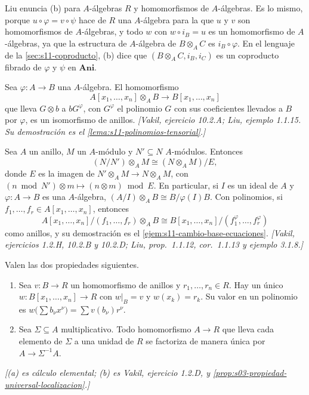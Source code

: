 Liu enuncia (b) para \(A\)-álgebras \(R\) y homomorfismos de \(A\)-álgebras. Es lo mismo, porque \(u\circ\varphi=v\circ\psi\) hace de \(R\) una \(A\)-álgebra para la que \(u\) y \(v\) son homomorfismos de \(A\)-álgebras, y todo \(w\) con \(w\circ i_B=u\) es un homomorfismo de \(A\)-álgebras, ya que la estructura de \(A\)-álgebra de \(B\otimes_A C\) es \(i_B\circ\varphi\). En el lenguaje de la \cref{sec:s11-coproducto}, (b) dice que \((B\otimes_A C,i_B,i_C)\) es un coproducto fibrado de \(\varphi\) y \(\psi\) en \(\mathbf{Ani}\).

\begin{prop}[Polinomios]
\label{prop:s11-polinomios-tensorial}
Sea \(\varphi\colon A\to B\) una \(A\)-álgebra. El homomorfismo
\[
 A[x_1,\ldots,x_n]\otimes_A B\longrightarrow B[x_1,\ldots,x_n]
\]
que lleva \(G\otimes b\) a \(bG^\varphi\), con \(G^\varphi\) el polinomio \(G\) con sus coeficientes llevados a \(B\) por \(\varphi\), es un isomorfismo de anillos. \emph{[Vakil, ejercicio 10.2.A; Liu, ejemplo 1.1.15. Su demostración es el \cref{lema:s11-polinomios-tensorial}.]}
\end{prop}

\begin{prop}
\label{prop:s11-exactitud-cocientes}
Sea \(A\) un anillo, \(M\) un \(A\)-módulo y \(N'\subseteq N\) \(A\)-módulos. Entonces
\[
 (N/N')\otimes_A M\cong(N\otimes_A M)/E,
\]
donde \(E\) es la imagen de \(N'\otimes_A M\to N\otimes_A M\), con \((n\bmod N')\otimes m\mapsto(n\otimes m)\bmod E\). En particular, si \(I\) es un ideal de \(A\) y \(\varphi\colon A\to B\) es una \(A\)-álgebra, \((A/I)\otimes_A B\cong B/\varphi(I)B\). Con polinomios, si \(f_1,\ldots,f_r\in A[x_1,\ldots,x_n]\), entonces
\[
 A[x_1,\ldots,x_n]/(f_1,\ldots,f_r)\otimes_A B\cong B[x_1,\ldots,x_n]/(f_1^\varphi,\ldots,f_r^\varphi)
\]
como anillos, y su demostración es el \cref{ejem:s11-cambio-base-ecuaciones}. \emph{[Vakil, ejercicios 1.2.H, 10.2.B y 10.2.D; Liu, prop.~1.1.12, cor.~1.1.13 y ejemplo 3.1.8.]}
\end{prop}

\begin{prop}
\label{prop:s11-universales}
Valen las dos propiedades siguientes.
\begin{enumerate}[label=(\alph*)]
\item Sea \(v\colon B\to R\) un homomorfismo de anillos y \(r_1,\ldots,r_n\in R\). Hay un único \(w\colon B[x_1,\ldots,x_n]\to R\) con \(w|_B=v\) y \(w(x_k)=r_k\). Su valor en un polinomio es \(w\bigl(\sum b_\nu x^\nu\bigr)=\sum v(b_\nu)r^\nu\).
\item Sea \(\Sigma\subseteq A\) multiplicativo. Todo homomorfismo \(A\to R\) que lleva cada elemento de \(\Sigma\) a una unidad de \(R\) se factoriza de manera única por \(A\to\Sigma^{-1}A\).
\end{enumerate}
\emph{[(a) es cálculo elemental; (b) es Vakil, ejercicio 1.2.D, y \cref{prop:s03-propiedad-universal-localizacion}.]}
\end{prop}

